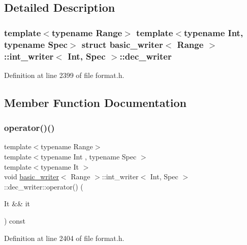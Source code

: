 \subsection{Detailed Description}
\subsubsection*{template$<$typename Range$>$\newline
template$<$typename Int, typename Spec$>$\newline
struct basic\+\_\+writer$<$ Range $>$\+::int\+\_\+writer$<$ Int, Spec $>$\+::dec\+\_\+writer}



Definition at line 2399 of file format.\+h.



\subsection{Member Function Documentation}
\mbox{\label{structbasic__writer_1_1int__writer_1_1dec__writer_a92c5f546b25a1e4b51d5ddeacfd226e6}} 
\subsubsection{\texorpdfstring{operator()()}{operator()()}}
{\footnotesize\ttfamily template$<$typename Range$>$ \\
template$<$typename Int , typename Spec $>$ \\
template$<$typename It $>$ \\
void \hyperlink{classbasic__writer}{basic\+\_\+writer}$<$ Range $>$\+::int\+\_\+writer$<$ Int, Spec $>$\+::dec\+\_\+writer\+::operator() (\begin{DoxyParamCaption}\item[{It \&\&}]{it }\end{DoxyParamCaption}) const\hspace{0.3cm}{\ttfamily [inline]}}



Definition at line 2404 of file format.\+h.

